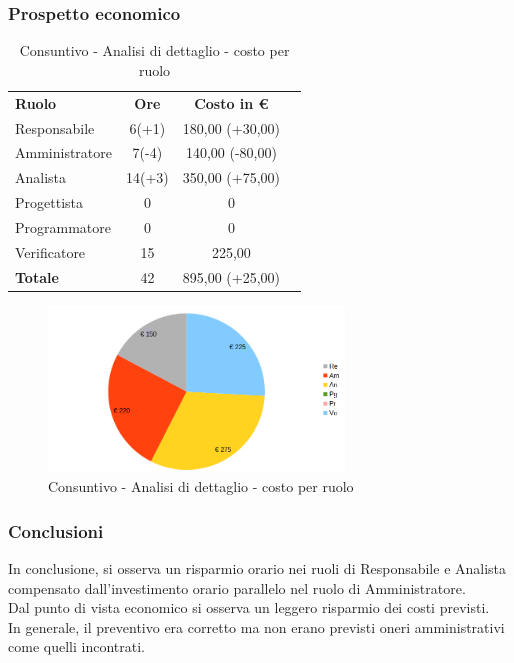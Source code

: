 \newpage
\subsubsection{Prospetto economico}


\begin{table} [h!]
	\begin{center}
		\begin{tabular} { m{3 cm} c c c  }
			\rowcolor{lightgray}
			\textbf{Ruolo}  & \textbf{Ore} & \textbf{Costo in \euro} \\
			Responsabile    & 6(+1)      & 180,00 (+30,00) \\
			Amministratore  & 7(-4)      & 140,00 (-80,00)  \\
			Analista        & 14(+3)     & 350,00 (+75,00) \\
			Progettista     & 0          & 0 \\
			Programmatore   & 0          & 0  \\
			Verificatore    & 15         & 225,00  \\
			\textbf{Totale} & 42         & 895,00 (+25,00) \\
			
		\end{tabular}
		\caption{Consuntivo - Analisi di dettaglio - costo per ruolo}
	\end{center}
\end{table}
	\begin{figure} [h!]
	\centering
	\includegraphics[width=0.7\textwidth]{res/img/grafici/consuntivo-torta-analisi di dettaglio.png}
	\caption{Consuntivo - Analisi di dettaglio - costo per ruolo} 
\end{figure}

\subsubsection{Conclusioni }
In conclusione, si osserva un risparmio orario nei ruoli di Responsabile e Analista compensato dall'investimento orario parallelo nel ruolo di Amministratore.\\
Dal punto di vista economico si osserva un leggero risparmio dei costi previsti. \\
In generale, il preventivo era corretto ma non erano previsti oneri amministrativi come quelli incontrati.


